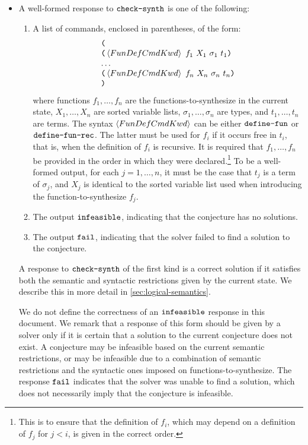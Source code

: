 \documentclass[english,a4paper,10pt]{article}
\begin{document}
\begin{itemize}
\item
A well-formed response to $\texttt{check-synth}$ is one of the following:

\begin{enumerate}
\item
A list of commands, enclosed in parentheses, of the form:
\[
\begin{array}{l}
\texttt{(}\\
\texttt{(}\left\langle FunDefCmdKwd\right\rangle\mbox{ }f_{1}\mbox{ }X_{1}\mbox{ }\sigma_{1}\mbox{ }t_{1}\texttt{)}\\
\ldots\\
\texttt{(}\left\langle FunDefCmdKwd\right\rangle\mbox{ }f_{n}\mbox{ }X_{n}\mbox{ }\sigma_{n}\mbox{ }t_{n}\texttt{)}\\
\texttt{)}
\end{array}
\]
where functions $f_{1}, \ldots, f_{n}$
are the functions-to-synthesize in the current state,
$X_{1}, \ldots, X_{n}$ are sorted variable lists,
$\sigma_{1}, \ldots, \sigma_{n}$ are types,
and $t_{1}, \ldots, t_{n}$ are terms.
The syntax $\left\langle FunDefCmdKwd\right\rangle$ can be either $\texttt{define-fun}$ or $\texttt{define-fun-rec}$.
The latter must be used for $f_i$ if it occurs free in $t_i$,
that is, when the definition of $f_i$ is recursive.
It is required that $f_1, \ldots, f_n$ be
provided in the order in which they were declared.\footnote{
This is to ensure that the definition of $f_i$, which may depend on a definition
of $f_j$ for $j<i$, is given in the correct order.
}
To be a well-formed output, 
for each $j=1, \ldots, n$, it must be the case that
$t_{j}$ is a term of $\sigma_{j}$,
and $X_{j}$ is identical to the sorted variable list
used when introducing the function-to-synthesize $f_{j}$.

\item
The output ${\tt infeasible}$,
indicating that the conjecture has no solutions.

\item
The output ${\tt fail}$,
indicating that the solver failed to find a solution to the conjecture.

\end{enumerate}

A response to $\texttt{check-synth}$ of the first kind is a correct solution if
it satisfies both the semantic and syntactic restrictions given by
the current state.
We describe this in more detail in \cref{sec:logical-semantics}.

We do not define the correctness of an ${\tt infeasible}$ response 
in this document. 
We remark that a response of this form should be given
by a solver only if it is certain that a solution to the current
conjecture does not exist.
A conjecture may be infeasible based on the current semantic
restrictions, or may be infeasible due to a combination
of semantic restrictions and the syntactic ones imposed on functions-to-synthesize.
The response ${\tt fail}$ indicates that the solver
was unable to find a solution, which does not necessarily imply that
the conjecture is infeasible.

\end{itemize}
\end{document}
